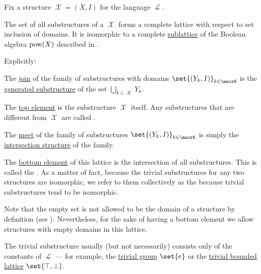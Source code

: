 \begin{proposition}\label{thm:substructures_form_complete_lattice}
  Fix a structure \( \mscrX = (X, I) \) for the language \( \mscrL \).

  The set of all substructures of a \( \mscrX \) forms a complete lattice with respect to set inclusion of domains. It is isomorphic to a complete \hyperref[def:semilattice/submodel]{sublattice} of the Boolean algebra \( \operatorname{pow}(X) \) described in .

  Explicitly:
  \begin{thmenum}
     The \hyperref[def:semilattice/join]{join} of the family of substructures with domains \( \set{ (Y_k, I) }_{k \in \mscrK} \) is the \hyperref[def:first_order_generated_substructure]{generated substructure} of the set \( \bigcup_{k \in \mscrK} Y_k \).

     The \hyperref[def:poset_extremal_points/top_and_bottom]{top element} is the substructure \( \mscrX \) itself. Any substructures that are different from \( \mscrX \) are called .

     The \hyperref[def:semilattice/meet]{meet} of the family of substructures \( \set{ (Y_k, I) }_{k \in \mscrK} \) is simply the \hyperref[thm:first_order_substructure_properties/intersection]{intersection structure} of the family.

     The \hyperref[def:poset_extremal_points/top_and_bottom]{bottom element} of this lattice is the intersection of all substructures. This is called the . As a matter of fact, because the trivial substructures for any two structures are isomorphic, we refer to them collectively as the  because trivial substructures tend to be isomorphic.

    Note that the empty set is not allowed to be the domain of a structure by definition (see ). Nevertheless, for the sake of having a bottom element we allow structures with empty domains in this lattice.

    The trivial substructure usually (but not necessarily) consists only of the constants of \( \mscrL \) --- for example, the \hyperref[def:group/trivial]{trivial group} \( \set{ e } \) or the \hyperref[def:semilattice/trivial]{trivial bounded lattice} \( \set{ \top, \bot } \).
  \end{thmenum}
\end{proposition}
